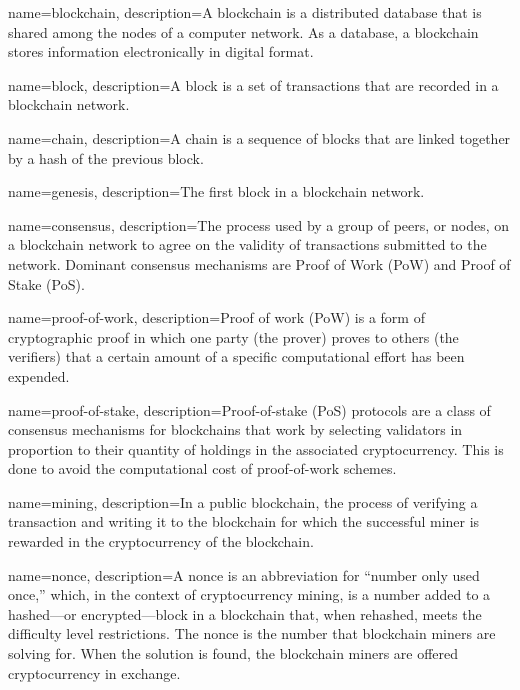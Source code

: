 



 {
	name=blockchain,
	description={A blockchain is a distributed database that is shared among the nodes of a computer network. As a database, a blockchain stores information electronically in digital format.}
}

 {
	name=block,
	description={A block is a set of transactions that are recorded in a blockchain network.}
}

 {
	name=chain,
	description={A chain is a sequence of blocks that are linked together by a hash of the previous block.}
}

 {
	name=genesis,
	description={The first block in a blockchain network.}
}

 {
	name=consensus,
	description={The process used by a group of peers, or nodes, on a blockchain network to agree on the validity of transactions submitted to the network. Dominant consensus mechanisms are Proof of Work (PoW) and Proof of Stake (PoS).}
}

 {
	name=proof-of-work,
	description={Proof of work (PoW) is a form of cryptographic proof in which one party (the prover) proves to others (the verifiers) that a certain amount of a specific computational effort has been expended.}
}

 {
	name=proof-of-stake,
	description={Proof-of-stake (PoS) protocols are a class of consensus mechanisms for blockchains that work by selecting validators in proportion to their quantity of holdings in the associated cryptocurrency. This is done to avoid the computational cost of proof-of-work schemes.}
}

 {
	name=mining,
	description={In a public blockchain, the process of verifying a transaction and writing it to the blockchain for which the successful miner is rewarded in the cryptocurrency of the blockchain.}
}

 {
	name=nonce,
	description={A nonce is an abbreviation for ``number only used once,'' which, in the context of cryptocurrency mining, is a number added to a hashed—or encrypted—block in a blockchain that, when rehashed, meets the difficulty level restrictions. The nonce is the number that blockchain miners are solving for. When the solution is found, the blockchain miners are offered cryptocurrency in exchange.}
}

